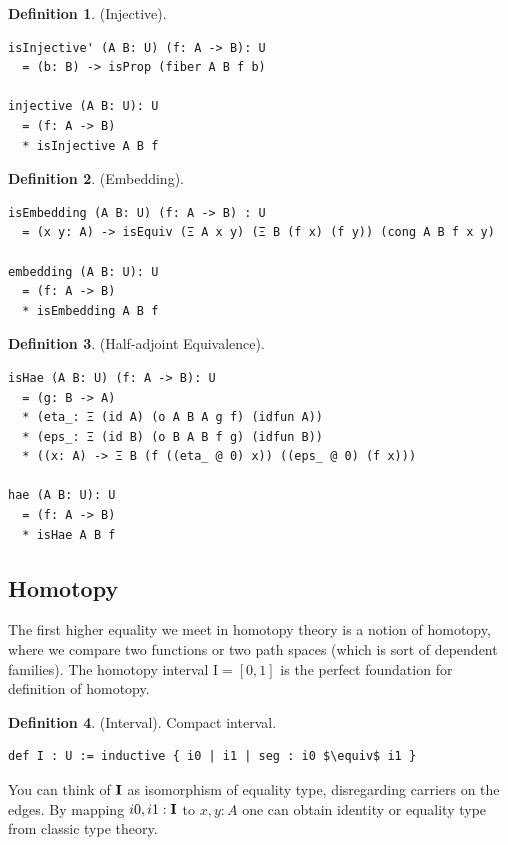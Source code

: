 \documentclass{article}
\theoremstyle{definition}
\newtheorem{definition}{Definition}
\begin{document}
\begin{definition} (Injective).
\begin{lstlisting}
isInjective' (A B: U) (f: A -> B): U
  = (b: B) -> isProp (fiber A B f b)

injective (A B: U): U
  = (f: A -> B)
  * isInjective A B f
\end{lstlisting}
\end{definition}

\begin{definition} (Embedding).
\begin{lstlisting}
isEmbedding (A B: U) (f: A -> B) : U
  = (x y: A) -> isEquiv (Ξ A x y) (Ξ B (f x) (f y)) (cong A B f x y)

embedding (A B: U): U
  = (f: A -> B)
  * isEmbedding A B f
\end{lstlisting}
\end{definition}

\begin{definition} (Half-adjoint Equivalence).
\begin{lstlisting}
isHae (A B: U) (f: A -> B): U
  = (g: B -> A)
  * (eta_: Ξ (id A) (o A B A g f) (idfun A))
  * (eps_: Ξ (id B) (o B A B f g) (idfun B))
  * ((x: A) -> Ξ B (f ((eta_ @ 0) x)) ((eps_ @ 0) (f x)))

hae (A B: U): U
  = (f: A -> B)
  * isHae A B f
\end{lstlisting}
\end{definition}

\newpage
\subsection{Homotopy}

The first higher equality we meet in homotopy theory is a notion of homotopy,
where we compare two functions or two path spaces (which is sort of dependent families).
The homotopy interval $\mathrm{I}=[0,1]$ is the perfect foundation for definition of homotopy.

\begin{definition} (Interval). Compact interval.
\begin{lstlisting}[mathescape=true]
def I : U := inductive { i0 | i1 | seg : i0 $\equiv$ i1 }
\end{lstlisting}
\end{definition}

You can think of ${\bf I}$ as isomorphism of equality type,
disregarding carriers on the edges. By mapping $i0,i1:{\bf I}$ to $x,y:A$ one can
obtain identity or equality type from classic type theory.
\end{document}
